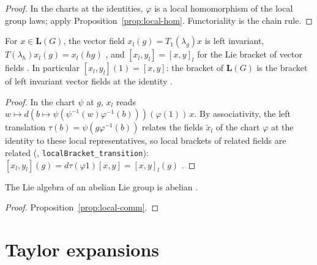 \begin{proof}
  \leanok
  In the charts at the identities, $\varphi$ is a local homomorphism of the local group laws;
  apply Proposition~\ref{prop:local-hom}. Functoriality is the chain rule.
\end{proof}


\begin{theorem}
  \label{thm:left-fields}
  \leanok
  For $x \in \mathbf{L}(G)$, the vector field $x_l(g) = T_1(\lambda_g)x$ is left invariant,
  $T(\lambda_h) x_l(g) = x_l(hg)$ \cite[(5.2)]{GN26}, and $[x_l, y_l] = [x, y]_l$ for the Lie
  bracket of vector fields \cite[(5.3)]{GN26}. In particular $[x_l, y_l](1) = [x, y]$: the bracket
  of $\mathbf{L}(G)$ is the bracket of left invariant vector fields at the identity
  \cite[Definition 5.1.6]{GN26}.
\end{theorem}

\begin{proof}
  \leanok
  In the chart $\psi$ at $g$, $x_l$ reads $w \mapsto d(b \mapsto \psi(\psi^{-1}(w)\varphi^{-1}(b)))
  (\varphi(1))\,x$. By associativity, the left translation $\tau(b) = \psi(g\varphi^{-1}(b))$
  relates the fields $\tilde x_l$ of the chart $\varphi$ at the identity to these local
  representatives, so local brackets of related fields are related (\cite{LCM},
  \texttt{localBracket\_transition}):
  $[x_l, y_l](g) = d\tau(\varphi 1)[x, y] = [x, y]_l(g)$ \cite[Lemma 3.4.17]{GN26}.
\end{proof}

\begin{proposition}
  \label{prop:lie-abelian}
  \leanok
  The Lie algebra of an abelian Lie group is abelian \cite[Example 5.1.9(a)]{GN26}.
\end{proposition}

\begin{proof}
  \leanok
  Proposition~\ref{prop:local-comm}.
\end{proof}

\section{Taylor expansions}

